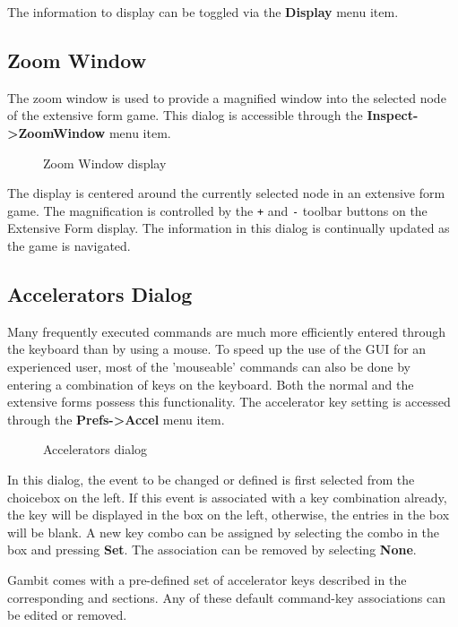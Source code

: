 \documentclass[12pt]{report}
\begin{document}
The information to display can be toggled via the {\bf Display} menu
item.

\subsection{Zoom Window}\label{ZoomWindow}

The zoom window is used to provide a magnified window into the
selected node of the extensive form game.  This dialog is accessible
through the {\bf Inspect->ZoomWindow} menu item. 

\begin{figure}
\caption{Zoom Window display}\label{fig_zoomwin}
\end{figure}

The display is centered around the currently selected node in an
extensive form game.  The magnification is controlled by the {\tt +}
and {\tt -} toolbar buttons on the Extensive Form display.  The
information in this dialog is continually updated as the game is
navigated.

\subsection{Accelerators Dialog}\label{AcceleratorSec}

Many frequently executed commands are much more efficiently entered
through the keyboard than by using a mouse.  To speed up the use of
the GUI for an experienced user, most of the 'mouseable' commands can
also be done by entering a combination of keys on the keyboard.  Both
the normal and the extensive forms possess this functionality.  The
accelerator key setting is accessed through the {\bf Prefs->Accel} 
menu item.

\begin{figure}
\caption{Accelerators dialog}\label{fig_accel}
\end{figure}

In this dialog, the event to be changed or defined is first selected
from the choicebox on the left.  If this event is associated with a
key combination already, the key will be displayed in the box on the
left, otherwise, the entries in the box will be blank.  A new key
combo can be assigned by selecting the combo in the box and pressing 
{\bf Set}.  The association can be removed by selecting {\bf None}.

Gambit comes with a pre-defined set of accelerator keys described in
the corresponding  and
 sections.  Any of these default
command-key associations can be edited or removed.  
\end{document}
